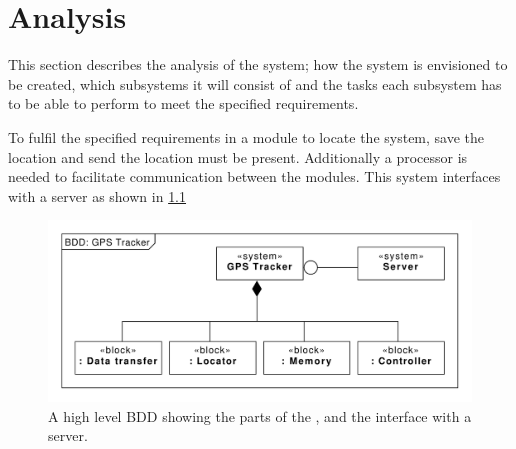 
\chapter{Analysis}
This section describes the analysis of the system; how the system is envisioned to be created, which subsystems it will consist of and the tasks each subsystem has to be able to perform to meet the specified requirements.

To fulfil the specified requirements in  a module to locate the system, save the location and send the location must be present. Additionally a processor is needed to facilitate communication between the modules. This system interfaces with a server as shown in \cref{fig:BDD:unspecified}

\begin{figure}[H]
	\centering
	\includegraphics[width=0.7\linewidth]{gfx/Design/BDD_Unspecified.pdf}
	\caption{A high level BDD showing the parts of the \systemName, and the interface with a server.}
	\label{fig:BDD:unspecified}
\end{figure}

\FloatBarrier
